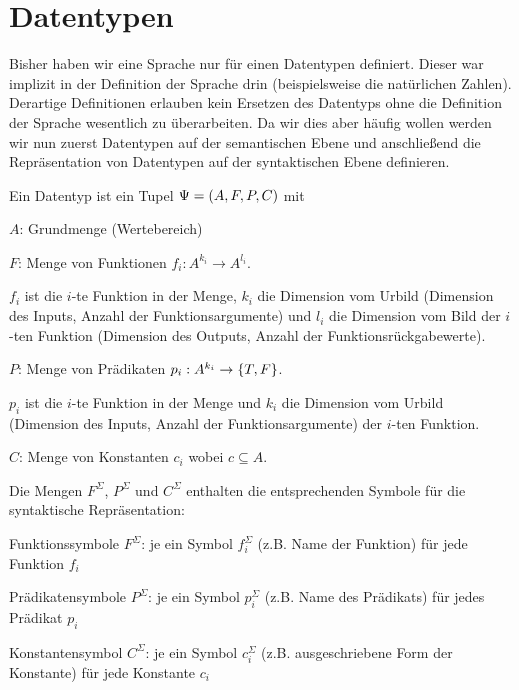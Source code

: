 \section{Datentypen}
Bisher haben wir eine Sprache nur für einen Datentypen definiert. Dieser war implizit in der
Definition der Sprache drin (beispielsweise die natürlichen Zahlen). Derartige Definitionen
erlauben kein Ersetzen des Datentyps ohne die Definition der Sprache wesentlich zu überarbeiten.
Da wir dies aber häufig wollen werden wir nun zuerst Datentypen auf der semantischen Ebene
und anschließend die Repräsentation von Datentypen auf der syntaktischen Ebene definieren.
\begin{defn}[Datentyp]
Ein Datentyp ist ein Tupel $\Psi=\left(A,F,P,C\right)$ mit
\begin{\whichitem}
\item $A$: Grundmenge (Wertebereich)
\item $F$: Menge von Funktionen $f_i: A^{k_i} \to A^{l_i}$.

$f_i$ ist die $i$-te Funktion in der Menge, $k_i$ die Dimension vom Urbild (Dimension des Inputs, Anzahl der Funktionsargumente) und $l_i$
die Dimension vom Bild der $i$-ten Funktion (Dimension des Outputs, Anzahl der Funktionsrückgabewerte).
\item $P$: Menge von Prädikaten $p_i: A^{k_i} \to \left\{T,F\right\}$.

$p_i$ ist die $i$-te Funktion in der Menge und $k_i$ die Dimension vom Urbild (Dimension des Inputs, Anzahl der Funktionsargumente) der $i$-ten Funktion.
\item $C$: Menge von Konstanten $c_i$ wobei $c \subseteq A$.
\end{\whichitem}
Die Mengen $F^{\Sigma}$, $P^{\Sigma}$ und $C^{\Sigma}$ enthalten die entsprechenden Symbole für die syntaktische Repräsentation:
\begin{\whichitem}
\item Funktionssymbole $F^{\Sigma}$: je ein Symbol $f^{\Sigma}_i$ (z.B. Name der Funktion) für jede Funktion $f_i$
\item Prädikatensymbole $P^{\Sigma}$: je ein Symbol $p^{\Sigma}_i$ (z.B. Name des Prädikats) für jedes Prädikat $p_i$
\item Konstantensymbol $C^{\Sigma}$: je ein Symbol $c^{\Sigma}_i$ (z.B. ausgeschriebene Form der Konstante) für jede Konstante $c_i$
\end{\whichitem}
\end{defn}

